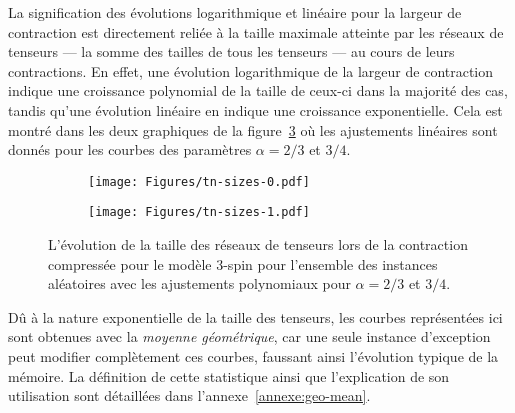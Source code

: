 La signification des évolutions logarithmique et linéaire pour la largeur de contraction est directement reliée à la taille maximale atteinte par les réseaux de tenseurs --- la somme des tailles de tous les tenseurs --- au cours de leurs contractions.
En effet, une évolution logarithmique de la largeur de contraction indique une croissance polynomial de la taille de ceux-ci dans la majorité des cas, tandis qu'une évolution linéaire en indique une croissance exponentielle.
Cela est montré dans les deux graphiques de la figure~\ref{fig:tn-sizes} où les ajustements linéaires sont donnés pour les courbes des paramètres $\alpha = 2/3$ et $3/4$.
\begin{figure}[h]
    \centering
    \begin{subfigure}{.49\textwidth}
        \centering
        \texttt{[image: Figures/tn-sizes-0.pdf]}
        \caption{}
        \label{subfig:tn-sizes-0}
    \end{subfigure}
    \hfill
    \begin{subfigure}{.49\textwidth}
        \centering
        \texttt{[image: Figures/tn-sizes-1.pdf]}
        \caption{}
        \label{subfig:tn-sizes-1}
    \end{subfigure}
    \caption[L'évolution de la taille des réseaux de tenseurs lors de la contraction compressée pour le modèle $3$-spin.]{L'évolution de la taille des réseaux de tenseurs lors de la contraction compressée pour le modèle $3$-spin pour l'ensemble des instances aléatoires avec les ajustements polynomiaux pour $\alpha = 2/3$ et $3/4$.}
    \label{fig:tn-sizes}
\end{figure}
Dû à la nature exponentielle de la taille des tenseurs, les courbes représentées ici sont obtenues avec la \emph{moyenne géométrique}, car une seule instance d'exception peut modifier complètement ces courbes, faussant ainsi l'évolution typique de la mémoire.
La définition de cette statistique ainsi que l'explication de son utilisation sont détaillées dans l'annexe~\ref{annexe:geo-mean}.

